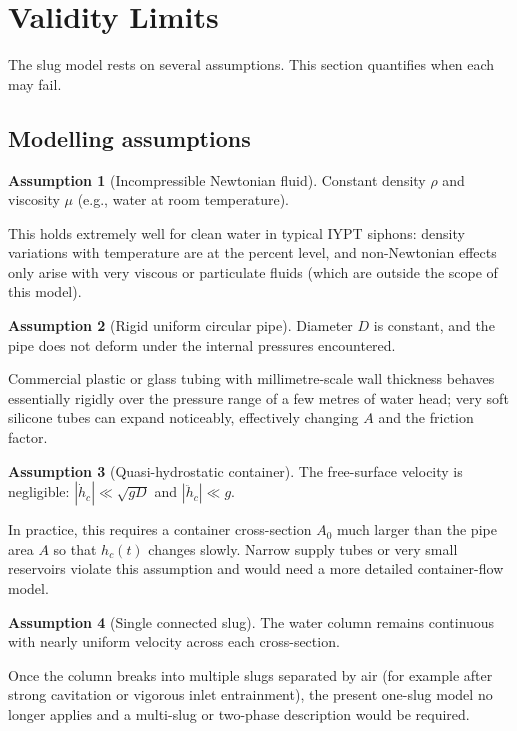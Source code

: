 \documentclass[11pt]{article}
\theoremstyle{definition}
\newtheorem{assumption}{Assumption}[section]
\begin{document}
\section{Validity Limits}
\label{sec:validity}

The slug model rests on several assumptions. This section quantifies when each may fail.

\subsection{Modelling assumptions}

\begin{assumption}[Incompressible Newtonian fluid]
Constant density $\rho$ and viscosity $\mu$ (e.g., water at room temperature).
\end{assumption}
This holds extremely well for clean water in typical IYPT siphons: density variations with 
temperature are at the percent level, and non-Newtonian effects only arise with very viscous 
or particulate fluids (which are outside the scope of this model).

\begin{assumption}[Rigid uniform circular pipe]
Diameter $D$ is constant, and the pipe does not deform under the internal pressures 
encountered.
\end{assumption}
Commercial plastic or glass tubing with millimetre-scale wall thickness behaves essentially 
rigidly over the pressure range of a few metres of water head; very soft silicone tubes can 
expand noticeably, effectively changing $A$ and the friction factor.

\begin{assumption}[Quasi-hydrostatic container]
The free-surface velocity is negligible: $|\dot{h}_c| \ll \sqrt{gD}$ and $|\ddot{h}_c| \ll g$.
\end{assumption}
In practice, this requires a container cross-section $A_0$ much larger than the pipe area $A$ 
so that $h_c(t)$ changes slowly. Narrow supply tubes or very small reservoirs violate this 
assumption and would need a more detailed container-flow model.

\begin{assumption}[Single connected slug]
The water column remains continuous with nearly uniform velocity across each cross-section.
\end{assumption}
Once the column breaks into multiple slugs separated by air (for example after strong 
cavitation or vigorous inlet entrainment), the present one-slug model no longer applies and a 
multi-slug or two-phase description would be required.
\end{document}
